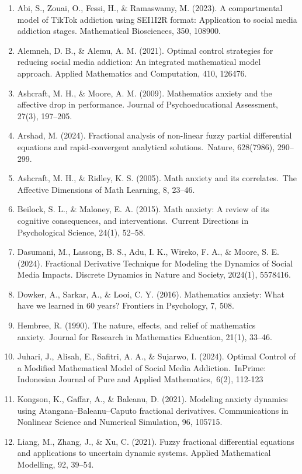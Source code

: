 \documentclass[10pt]{NSP1}
\begin{document}
\begin{enumerate}
  \item Abi, S., Zouai, O., Fessi, H., \& Ramaswamy, M. (2023). A compartmental model of TikTok addiction using SEI1I2R format: Application to social media addiction stages. Mathematical Biosciences, 350, 108900. 
  \item Alemneh, D. B., \& Alemu, A. M. (2021). Optimal control strategies for reducing social media addiction: An integrated mathematical model approach. Applied Mathematics and Computation, 410, 126476. 
  \item Ashcraft, M. H., \& Moore, A. M. (2009). Mathematics anxiety and the affective drop in performance. Journal of Psychoeducational Assessment, 27(3), 197–205. 
  \item Arshad, M. (2024). Fractional analysis of non-linear fuzzy partial differential equations and rapid-convergent analytical solutions. Nature, 628(7986), 290–299. 
  \item Ashcraft, M. H., \& Ridley, K. S. (2005). Math anxiety and its correlates. The Affective Dimensions of Math Learning, 8, 23–46.
  \item Beilock, S. L., \& Maloney, E. A. (2015). Math anxiety: A review of its cognitive consequences, and interventions. Current Directions in Psychological Science, 24(1), 52–58. 
  \item Dasumani, M., Lassong, B. S., Adu, I. K., Wireko, F. A., \& Moore, S. E. (2024). Fractional Derivative Technique for Modeling the Dynamics of Social Media Impacts. Discrete Dynamics in Nature and Society, 2024(1), 5578416.
  \item Dowker, A., Sarkar, A., \& Looi, C. Y. (2016). Mathematics anxiety: What have we learned in 60 years? Frontiers in Psychology, 7, 508. 
  \item Hembree, R. (1990). The nature, effects, and relief of mathematics anxiety. Journal for Research in Mathematics Education, 21(1), 33–46.
  \item Juhari, J., Alisah, E., Safitri, A. A., \& Sujarwo, I. (2024). Optimal Control of a Modified Mathematical Model of Social Media Addiction. InPrime: Indonesian Journal of Pure and Applied Mathematics, 6(2), 112-123
  \item Kongson, K., Gaffar, A., \& Baleanu, D. (2021). Modeling anxiety dynamics using Atangana–Baleanu–Caputo fractional derivatives. Communications in Nonlinear Science and Numerical Simulation, 96, 105715. 
  \item Liang, M., Zhang, J., \& Xu, C. (2021). Fuzzy fractional differential equations and applications to uncertain dynamic systems. Applied Mathematical Modelling, 92, 39–54. 

\end{enumerate}
\end{document}
